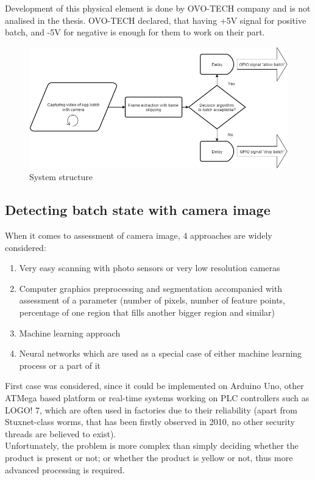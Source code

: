 \documentclass[12pt,twoside,a4paper]{article}
\begin{document}
Development of this physical element is done by OVO-TECH company and is not analised in the thesis. OVO-TECH declared, that having +5V signal for positive batch, and -5V for negative is enough for them to work on their part.


\begin{figure}[H]
\centering
\includegraphics[width=0.8\paperwidth]{system}
\caption{System structure}
\end{figure}



\subsection{Detecting batch state with camera image}

When it comes to assessment of camera image, 4 approaches are widely considered:
\begin{enumerate}
\item Very easy scanning with photo sensors or very low resolution cameras
\item Computer graphics preprocessing and segmentation accompanied with assessment of a parameter (number of pixels, number of feature points, percentage of one region that fills another bigger region and similar)
\item Machine learning approach
\item Neural networks which are used as a special case of either machine learning process or a part of it 
\end{enumerate}
First case was considered, since it could be implemented on Arduino Uno, other ATMega based platform or real-time systems working on PLC controllers such as LOGO! 7, which are often used in factories due to their reliability (apart from Stuxnet-class worms, that has been firstly observed in 2010, no other security threads are believed to exist).\\
Unfortunately, the problem is more complex than simply deciding whether the product is present or not; or whether the product is yellow or not, thus more advanced processing is required.\\
\end{document}
